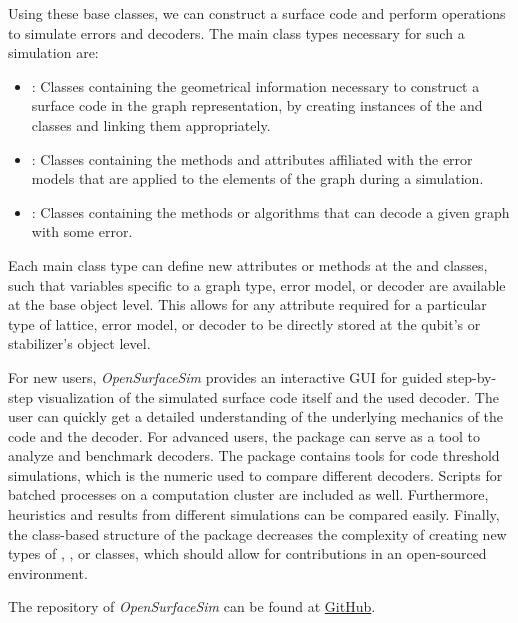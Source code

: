 Using these base classes, we can construct a surface code and perform operations to simulate errors and decoders. The main class types necessary for such a simulation are:
\begin{itemize}
    \item {}: Classes containing the geometrical information necessary to construct a surface code in the graph representation, by creating instances of the  and  classes and linking them appropriately.
    \item {}: Classes containing the methods and attributes affiliated with the error models that are applied to the elements of the graph during a simulation.
    \item {}: Classes containing the methods or algorithms that can decode a given graph with some error. 
\end{itemize}
Each main class type can define new attributes or methods at the  and  classes, such that variables specific to a graph type, error model, or decoder are available at the base object level. This allows for any attribute required for a particular type of lattice, error model, or decoder to be directly stored at the qubit's or stabilizer's object level. 

For new users, \emph{OpenSurfaceSim} provides an interactive GUI for guided step-by-step visualization of the simulated surface code itself and the used decoder. The user can quickly get a detailed understanding of the underlying mechanics of the code and the decoder. For advanced users, the package can serve as a tool to analyze and benchmark decoders. The package contains tools for code threshold simulations, which is the numeric used to compare different decoders. Scripts  for batched processes on a computation cluster are included as well. Furthermore, heuristics and results from different simulations can be compared easily. Finally, the class-based structure of the package decreases the complexity of creating new types of , , or  classes, which should allow for contributions in an open-sourced environment. 

The repository of \emph{OpenSurfaceSim} can be found at \href{https://github.com/OpenSurfaceSim}{GitHub}. 

